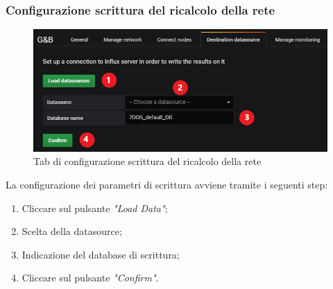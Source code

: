 \subsubsection{Configurazione scrittura del ricalcolo della rete}
\begin{figure} [H]
	\centering
	\includegraphics[scale=0.55]{Img/setds} 
	\caption{Tab di configurazione scrittura del ricalcolo della rete} \label{} 
\end{figure} 
La configurazione dei parametri di scrittura avviene tramite i seguenti step:
\begin{enumerate}
	\item Cliccare sul pulsante \emph{"Load Data"};
	\item Scelta della datasource;
	\item Indicazione del database di scrittura;
	\item Cliccare sul pulsante \emph{"Confirm"}.
\end{enumerate}
